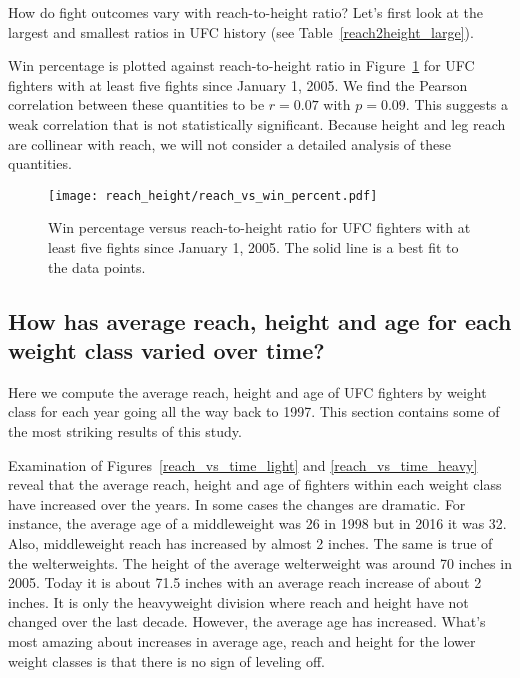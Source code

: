 How do fight outcomes vary with reach-to-height ratio? Let's first look
at the largest and smallest ratios in UFC history (see
Table~\ref{reach2height_large}).

\clearpage

Win percentage is plotted against reach-to-height ratio in
Figure~\ref{reach_vs_win_percent} for UFC
fighters with at least five fights since January 1, 2005.
We find the Pearson correlation between these quantities
to be $r=0.07$ with $p=0.09$. This suggests
a weak correlation that is not statistically significant.
Because height and leg reach are collinear with reach, we will not
consider a detailed analysis of these quantities.

\begin{figure}[h]
\begin{center}
\texttt{[image: reach\_height/reach\_vs\_win\_percent.pdf]}
\caption{Win percentage versus reach-to-height ratio for UFC
fighters with at least five fights since January 1, 2005. The solid line
is a best fit to the data points.}
\label{reach_vs_win_percent}
\end{center}
\end{figure}


\clearpage
\subsection*{How has average reach, height and age for each weight class varied over time?}

Here we compute the average reach, height and age of UFC fighters
by weight class
for each year going all the way back to 1997. This section
contains some of the most striking results of this study.

Examination of Figures~\ref{reach_vs_time_light} and
\ref{reach_vs_time_heavy} reveal that the average reach,
height and age of fighters within each weight class
have increased over the years. In some cases the changes
are dramatic.
For instance, the average age of a middleweight was
26 in 1998 but in 2016 it was 32. Also, middleweight reach
has increased by almost 2 inches. The same is true of
the welterweights.
The height of the average welterweight was around 70 inches in 2005.
Today it is about 71.5 inches with an average reach increase of
about 2 inches. It is only the heavyweight division where
reach and height have not changed over the last decade. However,
the average age has increased. What's most amazing about increases
in average age, reach and height for the lower weight classes is
that there is no sign of leveling off.

